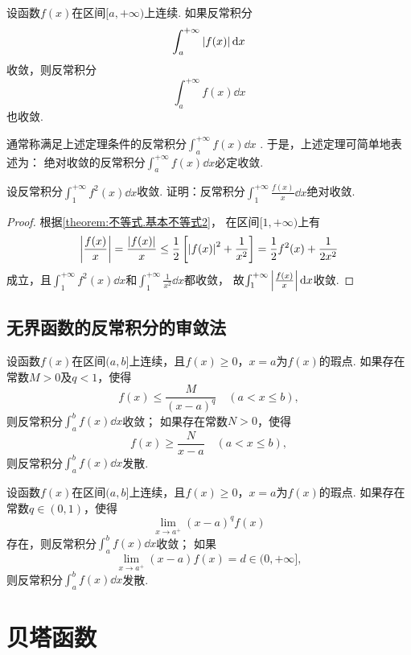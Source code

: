 \begin{theorem}\label{theorem:定积分.绝对收敛的无穷限反常积分必收敛}
设函数\(f(x)\)在区间\([a,+\infty)\)上连续.
如果反常积分\[
\int_a^{+\infty} \abs{f(x)} \dd{x}
\]收敛，则反常积分\[
\int_a^{+\infty} f(x) \dd{x}
\]也收敛.
\end{theorem}
通常称满足上述定理条件的反常积分\(\int_a^{+\infty} f(x) \dd{x}\) .
于是，上述定理可简单地表述为：
绝对收敛的反常积分\(\int_a^{+\infty} f(x) \dd{x}\)必定收敛.

\begin{example}
设反常积分\(\int_1^{+\infty} f^2(x) \dd{x}\)收敛.
证明：反常积分\(\int_1^{+\infty} \frac{f(x)}{x} \dd{x}\)绝对收敛.
\begin{proof}
根据\cref{theorem:不等式.基本不等式2}，
在区间\([1,+\infty)\)上有\[
\abs{\frac{f(x)}{x}}
= \frac{\abs{f(x)}}{x}
\leq \frac{1}{2} \left[
	\abs{f(x)}^2 + \frac{1}{x^2}
\right]
= \frac{1}{2} f^2(x) + \frac{1}{2x^2}
\]成立，且\(\int_1^{+\infty} f^2(x) \dd{x}\)和\(\int_1^{+\infty} \frac{1}{x^2} \dd{x}\)都收敛，
故\(\int_1^{+\infty} \abs{\frac{f(x)}{x}} \dd{x}\)收敛.
\end{proof}
\end{example}

\subsection{无界函数的反常积分的审敛法}
\begin{theorem}[比较审敛法]\label{theorem:定积分.无界函数的反常积分的比较审敛法}
设函数\(f(x)\)在区间\((a,b]\)上连续，且\(f(x) \geq 0\)，\(x=a\)为\(f(x)\)的瑕点.
如果存在常数\(M > 0\)及\(q < 1\)，使得\[
f(x) \leq \frac{M}{(x-a)^q} \quad (a < x \leq b),
\]则反常积分\(\int_a^b f(x) \dd{x}\)收敛；
如果存在常数\(N > 0\)，使得\[
f(x) \geq \frac{N}{x - a} \quad (a < x \leq b),
\]则反常积分\(\int_a^b f(x) \dd{x}\)发散.
\end{theorem}

\begin{theorem}[极限审敛法]\label{theorem:定积分.无界函数的反常积分的极限审敛法}
设函数\(f(x)\)在区间\((a,b]\)上连续，且\(f(x) \geq 0\)，\(x=a\)为\(f(x)\)的瑕点.
如果存在常数\(q \in (0,1)\)，使得\[
\lim_{x \to a^+} (x-a)^q f(x)
\]存在，则反常积分\(\int_a^b f(x) \dd{x}\)收敛；
如果\[
\lim_{x \to a^+} (x-a) f(x) = d \in (0,+\infty],
\]则反常积分\(\int_a^b f(x) \dd{x}\)发散.
\end{theorem}

\section{贝塔函数}
